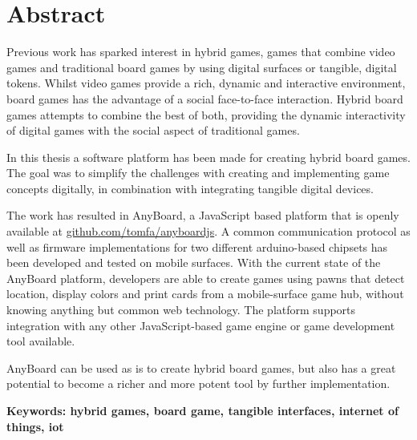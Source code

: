 \chapter{Abstract}
Previous work has sparked interest in hybrid games, games that combine video games and traditional board games by using digital surfaces or tangible, digital tokens. Whilst video games provide a rich, dynamic and interactive environment, board games has the advantage of a social face-to-face interaction. Hybrid board games attempts to combine the best of both, providing the dynamic interactivity of digital games with the social aspect of traditional games.

In this thesis a software platform has been made for creating hybrid board games. The goal was to simplify the challenges with creating and implementing game concepts digitally, in combination with integrating tangible digital devices.

The work has resulted in AnyBoard, a JavaScript based platform that is openly available at \href{https://github.com/tomfa/anyboardjs/}{github.com/tomfa/anyboardjs}. A common communication protocol as well as firmware implementations for two different arduino-based chipsets has been developed and tested on mobile surfaces. With the current state of the AnyBoard platform, developers are able to create games using pawns that detect location, display colors and print cards from a mobile-surface game hub, without knowing anything but common web technology. The platform supports integration with any other JavaScript-based game engine or game development tool available.

AnyBoard can be used as is to create hybrid board games, but also has a great potential to become a richer and more potent tool by further implementation.


\textbf{Keywords: hybrid games, board game, tangible interfaces, internet of things, iot}
\newpage
